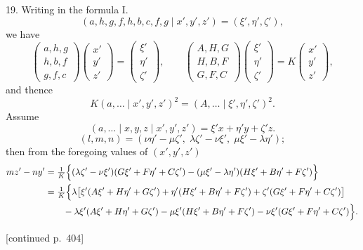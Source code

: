 \documentclass[11pt]{article}
\begin{document}
\textsc{19.} Writing in the formula \textsc{I.}
\[ (a,h,g,f,h,b,c,f,g \mid x',y',z')=(\xi',\eta',\zeta'), \]
we have
\[
\begin{pmatrix}a,h,g\\ h,b,f\\ g,f,c\end{pmatrix}
\begin{pmatrix}x'\\ y'\\ z'\end{pmatrix}=
\begin{pmatrix}\xi'\\ \eta'\\ \zeta'\end{pmatrix},
\qquad
\begin{pmatrix}A,H,G\\ H,B,F\\ G,F,C\end{pmatrix}
\begin{pmatrix}\xi'\\ \eta'\\ \zeta'\end{pmatrix}=
K\begin{pmatrix}x'\\ y'\\ z'\end{pmatrix},
\]
and thence
\[ K(a,\dots \mid x',y',z')^{2}=(A,\dots \mid \xi',\eta',\zeta')^{2}. \]
Assume
\[ (a,\dots \mid x,y,z \mid x',y',z')=\xi' x+\eta' y+\zeta' z. \]
\[ (l,m,n)=(\nu\eta'-\mu\zeta',\;\lambda\zeta'-\nu\xi',\;\mu\xi'-\lambda\eta'); \]
then from the foregoing values of $(x',y',z')$
\begin{align*}
mz'-ny' &= \tfrac{1}{K}\Bigl\{(\lambda\zeta'-\nu\xi')(G\xi'+F\eta'+C\zeta')-(\mu\xi'-\lambda\eta')(H\xi'+B\eta'+F\zeta')\Bigr\}\\
&= \tfrac{1}{K}\Bigl\{\lambda\bigl[\xi'(A\xi'+H\eta'+G\zeta')+\eta'(H\xi'+B\eta'+F\zeta')+\zeta'(G\xi'+F\eta'+C\zeta')\bigr]\\
&\qquad -\lambda\xi'(A\xi'+H\eta'+G\zeta')-\mu\xi'(H\xi'+B\eta'+F\zeta')-\nu\xi'(G\xi'+F\eta'+C\zeta')\Bigr\}.
\end{align*}

\bigskip
\hfill [continued p.~404]
\end{document}
